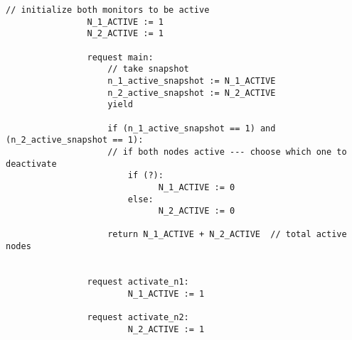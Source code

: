 \begin{minipage}[t]{1.0\textwidth}
	\begin{lstlisting}[caption={Snapshot-based monitor deactivation (not serializable)},numbers=none]
				// initialize both monitors to be active
				N_1_ACTIVE := 1
				N_2_ACTIVE := 1
				
				request main:
					// take snapshot
					n_1_active_snapshot := N_1_ACTIVE
					n_2_active_snapshot := N_2_ACTIVE
					yield
					
					if (n_1_active_snapshot == 1) and (n_2_active_snapshot == 1):
					// if both nodes active --- choose which one to deactivate 
						if (?): 
							  N_1_ACTIVE := 0
						else:
							  N_2_ACTIVE := 0
						
					return N_1_ACTIVE + N_2_ACTIVE  // total active nodes
					
				
				request activate_n1:
					    N_1_ACTIVE := 1
				
				request activate_n2:
					    N_2_ACTIVE := 1
				
				
			\end{lstlisting}
\end{minipage}




%
%
%
%





